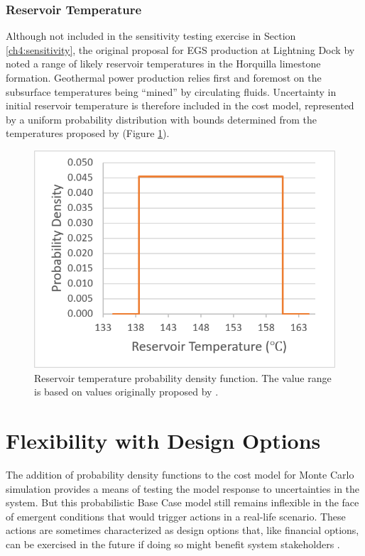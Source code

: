 \subsubsection{Reservoir Temperature}\label{cm4:prob_temp}
Although not included in the sensitivity testing exercise in Section \ref{ch4:sensitivity}, the original proposal for EGS production at Lightning Dock by \citet{schochet_development_2001} noted a range of likely reservoir temperatures in the Horquilla limestone formation. Geothermal power production relies first and foremost on the subsurface temperatures being ``mined'' by circulating fluids. Uncertainty in initial reservoir temperature is therefore included in the cost model, represented by a uniform probability distribution with bounds determined from the temperatures proposed by \citet{schochet_development_2001} (Figure \ref{fig:cm_temp_pdf}).

\begin{figure}[H]
\centering
\includegraphics[scale=0.45]{templates/images/Figure-Reservoir_Temp_PDF.png}
\singlespacing
\caption[Reservoir temperature PDF]{Reservoir temperature probability density function. The value range is based on values originally proposed by \protect\citet{schochet_development_2001}.}
\label{fig:cm_temp_pdf}
\end{figure}

\section{Flexibility with Design Options}\label{ch4:flex_design_options}
The addition of probability density functions to the cost model for Monte Carlo simulation provides a means of testing the model response to uncertainties in the system. But this probabilistic Base Case model still remains inflexible in the face of emergent conditions that would trigger actions in a real-life scenario. These actions are sometimes characterized as design options that, like financial options, can be exercised in the future if doing so might benefit system stakeholders \citep[p.\ 270-272]{de_neufville_flexibility_2011}.

